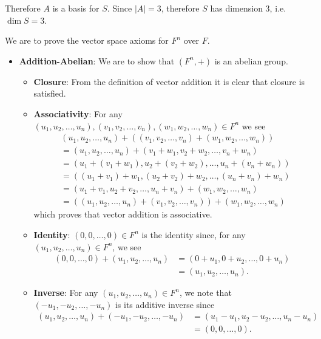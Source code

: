 \begin{questions}
\begin{partquestions}{\alph*}
        Therefore $A$ is a basis for $S$. Since $|A| = 3$, therefore $S$ has dimension 3, i.e. $\dim{S} = 3$.
    \end{partquestions}

    \item We are to prove the vector space axioms for $F^n$ over $F$.
    \begin{itemize}
        \item \textbf{Addition-Abelian}: We are to show that $(F^n, +)$ is an abelian group.
        \begin{itemize}
            \item \textbf{Closure}: From the definition of vector addition it is clear that closure is satisfied.

            \item \textbf{Associativity}: For any $(u_1, u_2, \dots, u_n), (v_1, v_2, \dots, v_n), (w_1, w_2, \dots, w_n) \in F^n$ we see
            \begin{align*}
                &(u_1, u_2, \dots, u_n) + ((v_1, v_2, \dots, v_n) + (w_1, w_2, \dots, w_n))\\
                &= (u_1, u_2, \dots, u_n) + (v_1 + w_1, v_2 + w_2, \dots, v_n + w_n)\\
                &= (u_1 + (v_1 + w_1), u_2 + (v_2 + w_2), \dots, u_n + (v_n + w_n))\\
                &= ((u_1 + v_1) + w_1, (u_2 + v_2) + w_2, \dots, (u_n + v_n) + w_n)\\
                &= (u_1 + v_1, u_2 + v_2, \dots, u_n + v_n) + (w_1, w_2, \dots, w_n)\\
                &= ((u_1, u_2, \dots, u_n) + (v_1, v_2, \dots, v_n)) + (w_1, w_2, \dots, w_n)
            \end{align*}
            which proves that vector addition is associative.

            \item \textbf{Identity}: $(0, 0, \dots, 0) \in F^n$ is the identity since, for any $(u_1, u_2, \dots, u_n) \in F^n$, we see
            \begin{align*}
                (0, 0, \dots, 0) + (u_1, u_2, \dots, u_n) &= (0 + u_1, 0 + u_2, \dots, 0 + u_n)\\
                &= (u_1, u_2, \dots, u_n).
            \end{align*}

            \item \textbf{Inverse}: For any $(u_1, u_2, \dots, u_n) \in F^n$, we note that $(-u_1, -u_2, \dots, -u_n)$ is its additive inverse since
            \begin{align*}
                (u_1, u_2, \dots, u_n) + (-u_1, -u_2, \dots, -u_n) &= (u_1 - u_1, u_2 - u_2, \dots, u_n - u_n)\\
                &= (0, 0, \dots, 0).
            \end{align*}


\end{itemize}
\end{itemize}
\end{questions}
